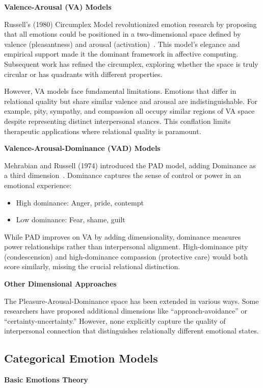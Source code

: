 \documentclass[10pt,twocolumn]{article}
\begin{document}
\textbf{Valence-Arousal (VA) Models}

Russell's (1980) Circumplex Model revolutionized emotion research by proposing that all emotions could be positioned in a two-dimensional space defined by valence (pleasantness) and arousal (activation)~\cite{russell1980}. This model's elegance and empirical support made it the dominant framework in affective computing. Subsequent work has refined the circumplex, exploring whether the space is truly circular or has quadrants with different properties.

However, VA models face fundamental limitations. Emotions that differ in relational quality but share similar valence and arousal are indistinguishable. For example, pity, sympathy, and compassion all occupy similar regions of VA space despite representing distinct interpersonal stances. This conflation limits therapeutic applications where relational quality is paramount.

\textbf{Valence-Arousal-Dominance (VAD) Models}

Mehrabian and Russell (1974) introduced the PAD model, adding Dominance as a third dimension~\cite{mehrabian1974}. Dominance captures the sense of control or power in an emotional experience:
\begin{itemize}
    \item High dominance: Anger, pride, contempt
    \item Low dominance: Fear, shame, guilt
\end{itemize}

While PAD improves on VA by adding dimensionality, dominance measures power relationships rather than interpersonal alignment. High-dominance pity (condescension) and high-dominance compassion (protective care) would both score similarly, missing the crucial relational distinction.

\textbf{Other Dimensional Approaches}

The Pleasure-Arousal-Dominance space has been extended in various ways. Some researchers have proposed additional dimensions like ``approach-avoidance'' or ``certainty-uncertainty.'' However, none explicitly capture the quality of interpersonal connection that distinguishes relationally different emotional states.

\subsection{Categorical Emotion Models}

\textbf{Basic Emotions Theory}
\end{document}
